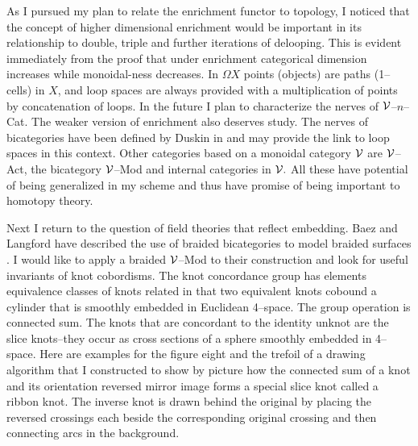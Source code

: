 \documentclass[10pt]{article}
\newcommand{\MySection}[1]
{\noindent{\bf #1}}
\begin{document}
     \begin{figure}[h]
     \centering
 \end{figure}
     As I pursued my plan to relate the enrichment functor to topology, I
    noticed that the concept of higher dimensional
    enrichment would be important in its relationship to double, triple and
    further iterations of delooping. This is evident immediately from the proof that
    under enrichment categorical dimension increases while monoidal-ness decreases.
    In $\Omega X$ points (objects) are paths (1--cells) in $X$, and loop spaces are always provided
    with a multiplication of points by concatenation of loops. 
    In the future I plan to characterize
    the nerves of ${\cal V}$--$n$--Cat. The weaker version of enrichment also deserves study.
    The nerves of bicategories
    have been defined by Duskin in \cite{Dusk} and may provide the link to loop spaces in this context.
    Other categories based on a monoidal category
    ${\cal V}$ are ${\cal V}$--Act, the bicategory ${\cal V}$--Mod and internal categories in ${\cal V}.$
    All these have potential of being generalized in my scheme and thus
    have promise of being important to homotopy theory. 
 
 \MySection{IV Applications} 
 
 Next I return to the question of field theories that reflect embedding. Baez and Langford have described
 the use of braided bicategories to model braided surfaces \cite{BaezLang}. I would like to apply a braided ${\cal V}$--Mod to 
 their construction and look for useful invariants of knot cobordisms. The knot concordance
 group has elements equivalence classes of knots related in that two equivalent knots
 cobound a cylinder that is smoothly embedded in Euclidean 4--space. The group operation
 is connected sum. The knots that are concordant to the identity unknot are the slice knots--they occur as 
 cross sections of a sphere smoothly embedded in 4--space. 
 Here are examples for the figure eight and the trefoil of a
 drawing algorithm that I constructed to show by picture how the connected sum of a 
 knot and its orientation reversed mirror image forms a special slice knot called a ribbon
 knot. The inverse knot is drawn behind the original by placing the reversed crossings each beside 
 the corresponding original crossing and then connecting arcs in the background. 
  
\end{document}
